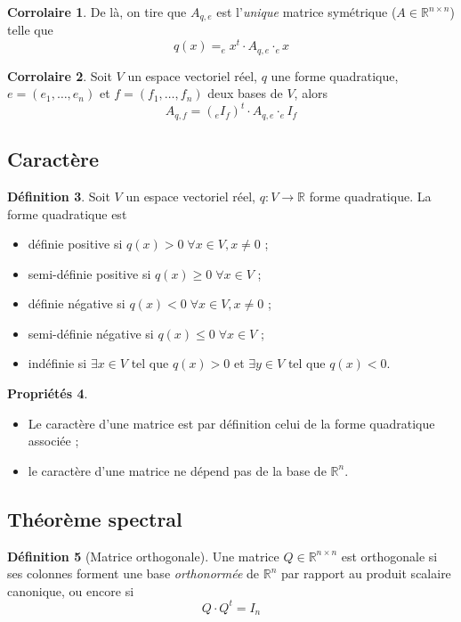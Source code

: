 \documentclass[11pt,a4paper]{article}
\theoremstyle{definition}
\newtheorem{mydef}{Définition}[section]
\newtheorem{myprop}[mydef]{Propriétés}
\newtheorem{mycorr}[mydef]{Corrolaire}
\newcommand{\R}{\mathbb{R}}
\newcommand*\InsertTheoremBreak{%
  \begingroup %
    \setlength\itemsep{0pt}%
    \setlength\parsep{0pt}%
    \item[\vbox{\null}]%
  \endgroup%
 }%
\begin{document}
\begin{mycorr} De là, on tire que $A_{q,e}$ est l'\emph{unique} matrice symétrique ($A \in \R^{n \times n}$) telle que
\[ q(x) = _e\!x^t \cdot A_{q,e} \cdot _e\!x \] \end{mycorr}

\begin{mycorr} Soit $V$ un espace vectoriel réel, $q$ une forme quadratique, $e = (e_1, \dots , e_n)$ et $f = (f_1, \dots, f_n)$ deux bases de $V$, alors
\[ A_{q,f} = (_eI_f)^t \cdot A_{q,e} \cdot _e\!I_f \]\end{mycorr}

\subsection{Caractère}

\begin{mydef} Soit $V$ un espace vectoriel réel, $q : V \rightarrow \R$ forme quadratique. La forme quadratique est
\begin{itemize}
\item définie positive si $q(x) >0 \; \forall x \in V, x \neq 0$ ;
\item semi-définie positive si $q(x) \geq 0 \; \forall x \in V$ ;
\item définie négative si $q(x) < 0 \; \forall x \in V, x \neq 0$ ;
\item semi-définie négative si $q(x) \leq 0 \; \forall x \in V$ ;
\item indéfinie si $\exists x \in V$ tel que $q(x) > 0$ et $\exists y \in V$ tel que $q(x) < 0$.
\end{itemize}
\end{mydef}

\begin{myprop}
\InsertTheoremBreak
\begin{itemize}
\item Le caractère d'une matrice est par définition celui de la forme quadratique associée ;
\item le caractère d'une matrice ne dépend pas de la base de $\R^n$.
\end{itemize}\end{myprop}

\subsection{Théorème spectral}

\begin{mydef}[Matrice orthogonale]
Une matrice $Q \in \R^{n \times n}$ est orthogonale si ses colonnes forment une base \emph{orthonormée} de $\R^n$ par rapport au produit scalaire canonique, ou encore si
\[ Q \cdot Q^t = I_n \]
\end{mydef}
\end{document}
